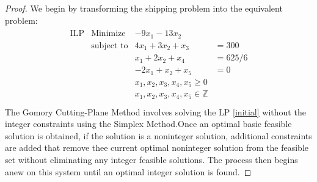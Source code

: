 \documentclass[12pt]{article}
\theoremstyle{definition}
\begin{document}
\begin{proof}
  We begin by transforming the shipping problem into the equivalent problem:
  \begin{align}\label{initial}
    \begin{array}{rlrl}
      \text{ILP} & \text{Minimize} & -9x_1 - 13x_2 & \\
      & \text{subject to} & 4x_1 + 3x_2 + x_3 &= 300\\
      & & x_1 + 2x_2 +x_4 &= 625/6 \\
      & & -2x_1 + x_2 + x_5 &= 0 \\
      & & x_1, x_2, x_3, x_4, x_5 \geq 0 \\
      & & x_1, x_2, x_3, x_4, x_5 \in \mathbb{Z}\\
    \end{array}
  \end{align}
  The Gomory Cutting-Plane Method involves solving the LP \eqref{initial} without the integer constraints
  using the Simplex Method.Once an optimal basic feasible solution is obtained, if the solution is a noninteger solution,
  additional constraints are added that remove thee current optimal noninteger solution from the feasible set without eliminating any integer feasible solutions.
  The process then begins anew on this system until an optimal integer solution is found.


\end{proof}
\end{document}
